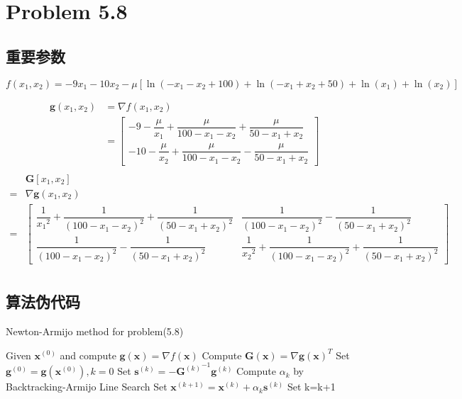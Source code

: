 \newpage
\section{Problem 5.8}
\subsection{重要参数}
\[f({x_1},{x_2})=-9{x_1}-10{x_2}-\mu \left[\ln(-{x_1}-{x_2}+100)+\ln (-{x_1}+{x_2}+50)+\ln ({x_1})+\ln ({x_2})\right]\]



\begin{align}
\bm{g}(x_1, x_2) &= \nabla f(x_1, x_2)\nonumber\\
&=
\begin{bmatrix}
-9 -\dfrac{\mu}{x_1 }+\dfrac{\mu}{100 - x_1 - x_2} + \dfrac{\mu}{50 - x_1 + x_2} \nonumber\\
-10 - \dfrac{\mu}{x_2 }+\dfrac{\mu}{100 - x_1 - x_2} - \dfrac{\mu}{50 - x_1 + x_2}
\end{bmatrix}\nonumber\\\nonumber
\end{align}
\begin{align}
&\bm{G}[x_1, x_2] \nonumber\\
=& \nabla \bm{g}(x_1, x_2)\nonumber \\
=&
\begin{bmatrix}
\dfrac{1}{{x_1}^2 }+\dfrac{1}{(100 - x_1 - x_2)^2} + \dfrac{1}{(50 - x_1 + x_2)^2} 
&\dfrac{1}{(100 - x_1 - x_2)^2} - \dfrac{1}{(50 - x_1 + x_2)^2}\\
\dfrac{1}{(100 - x_1 - x_2)^2} - \dfrac{1}{(50 - x_1 + x_2)^2}&
\dfrac{1}{{x_2}^2 }+\dfrac{1}{(100 - x_1 - x_2)^2} + \dfrac{1}{(50 - x_1 + x_2)^2} 
\end{bmatrix}\nonumber\\ \nonumber
\end{align}

\subsection{算法伪代码}
\begin{algorithm}[h]  
\caption{Newton-Armijo method for problem(5.8)}  
\begin{algorithmic}[1]  
\STATE Given $\bm{x}^{(0)}$ and compute $\bm{g}(\bm{x})= \nabla f(\bm{x})$
\STATE Compute $\bm{G}(\bm{x})= \nabla {\bm{g}(\bm{x})}^T$
\STATE Set $\bm{g}^{(0)}=\bm{g}(\bm{x}^{(0)}),k=0$
\STATE Set $\bm{s}^{(k)}=-{\bm{G}^{(k)}}^{-1}\bm{g}^{(k)}$
\STATE Compute $\alpha_k$ by Backtracking-Armijo Line Search
\STATE Set $\bm{x}^{(k+1)}=\bm{x}^{(k)}+\alpha_k\bm{s}^{(k)}$
\STATE Set k=k+1
\ENDWHILE
\end{algorithmic}  
\end{algorithm} 

